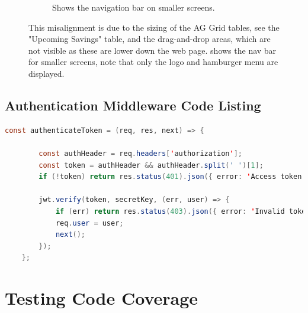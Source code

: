 \documentclass{l4proj}
\begin{document}
\begin{appendices}
\begin{figure}[htb]
\begin{subfigure}[b]{0.3\textwidth}
        \caption{Shows the navigation bar on smaller screens.}
        \label{fig:nav-bar-phone}
    \end{subfigure}   
    \caption{ This misalignment is due to the sizing of the AG Grid tables, see the "Upcoming Savings" table, and the drag-and-drop areas, which are not visible as these are lower down the web page.  shows the nav bar for smaller screens, note that only the logo and hamburger menu are displayed.
    }\label{fig:screenshots}
\end{figure}
\clearpage
\section{Authentication Middleware Code Listing}
\label{app:auth-middleware}
\begin{lstlisting}[language=Java, float, caption={The code in the authentication middleware which is used in the router.post calls as seen in Listing \ref{lst:authenticate-route}. If a token is provided, this code verifies it matches the token generated at login. If it does not, it throws an error.}, label=lst:authenticate-middleware]
    const authenticateToken = (req, res, next) => {

        const authHeader = req.headers['authorization'];
        const token = authHeader && authHeader.split(' ')[1];
        if (!token) return res.status(401).json({ error: 'Access token required'});
        
        jwt.verify(token, secretKey, (err, user) => {
            if (err) return res.status(403).json({ error: 'Invalid token' });
            req.user = user;
            next();
        });
    };
\end{lstlisting}

\chapter{Testing Code Coverage}


\end{appendices}
\end{document}
